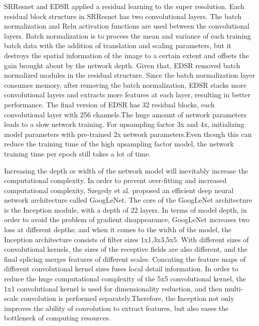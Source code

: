 \documentclass[runningheads,a4paper]{llncs}
\begin{document}
SRResnet \cite{Ledig2016Photo}and EDSR \cite{Lim2017Enhanced} applied a residual learning to the super resolution. Each residual block structure in SRResnet \cite{Ledig2016Photo} has two convolutional layers. The batch normalization and Relu activation functions are used between the convolutional layers. Batch normalization is to process the mean and variance of each training batch data with the addition of translation and scaling parameters, but it destroys the spatial information of the image to a certain extent and offsets the gain brought about by the network depth. Given that, EDSR  \cite{Lim2017Enhanced} removed batch normalized modules in the residual structure. Since the batch normalization layer consumes memory,  after removing the batch normalization, EDSR \cite{Lim2017Enhanced} stacks more convolutional layers and extracts more features at each layer, resulting in better performance. The final version of EDSR\cite{Lim2017Enhanced} has 32 residual blocks, each convolutional layer with 256 channels.The huge amount of network parameters leads to a slow network training. For upsampling factor 3x and 4x, initializing model parameters with pre-trained 2x network parameters.Even though this can reduce the training time of the high upsampling factor model, the network training time per epoch still takes a lot of time.

Increasing the depth or width of the network model will inevitably increase the computational complexity. In order to prevent over-fitting and increased computational complexity, Szegedy et al.\cite{Szegedy2014Going} proposed an efficient deep neural network architecture called GoogLeNet. The core of the GoogLeNet architecture is the Inception module, with a depth of 22 layers. In terms of model depth, in order to avoid the problem of gradient disappearance, GoogLeNet increases two loss at different depths; and when it comes to the width of the model, the Inception architecture consists of filter sizes 1x1,3x3,5x5. With different sizes of convolutional kernels, the sizes of the receptive fields are also different, and the final splicing merges features of different scales. Concating the feature maps of different convolutional kernel sizes fuses local detail information. In order to reduce the huge computational complexity of the 5x5 convolutional kernel, the 1x1 convolutional kernel is used for dimensionality reduction, and then multi-scale convolution is performed separately.Therefore, the Inception  not only improves the ability of convolution to extract features, but also eases the bottleneck of computing resources.
\end{document}
